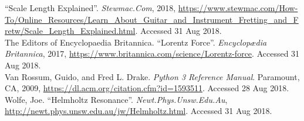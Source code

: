 \documentclass{article}
\begin{document}
\begin{hangparas}{.25in}{1}
``Scale Length Explained''. \textit{Stewmac.Com}, 2018, 
\url{https://www.stewmac.com/How-To/Online_Resources/Learn_About_Guitar_and_Instrument_Fretting_and_Fretw/Scale_Length_Explained.html}. Accessed 31 Aug 2018.\\

The Editors of Encyclopaedia Britannica. ``Lorentz Force''. 
\textit{Encyclopædia Britannica}, 2017, 
\url{https://www.britannica.com/science/Lorentz-force}. Accessed 31 Aug 2018.\\

Van Rossum, Guido, and Fred L. Drake. \textit{Python 3 Reference Manual}. 
Paramount, CA, 2009, \url{https://dl.acm.org/citation.cfm?id=1593511}. 
Accessed 28 Aug 2018.\\

Wolfe, Joe. ``Helmholtz Resonance''. \textit{Newt.Phys.Unsw.Edu.Au}, 
\url{http://newt.phys.unsw.edu.au/jw/Helmholtz.html}. Accessed 31 Aug 2018.\\

\end{hangparas}
\pagebreak
\end{document}
